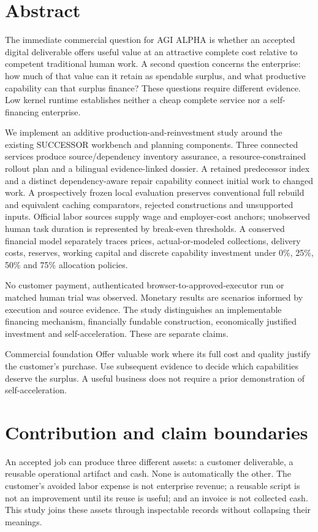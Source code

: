 \documentclass[11pt,a4paper]{article}
\begin{document}
\section*{Abstract}
The immediate commercial question for AGI ALPHA is whether an accepted digital deliverable offers useful value at an attractive complete cost relative to competent traditional human work. A second question concerns the enterprise: how much of that value can it retain as spendable surplus, and what productive capability can that surplus finance? These questions require different evidence. Low kernel runtime establishes neither a cheap complete service nor a self-financing enterprise.

We implement an additive production-and-reinvestment study around the existing SUCCESSOR workbench and planning components. Three connected services produce source/dependency inventory assurance, a resource-constrained rollout plan and a bilingual evidence-linked dossier. A retained predecessor index and a distinct dependency-aware repair capability connect initial work to changed work. A prospectively frozen local evaluation preserves conventional full rebuild and equivalent caching comparators, rejected constructions and unsupported inputs. Official labor sources supply wage and employer-cost anchors; unobserved human task duration is represented by break-even thresholds. A conserved financial model separately traces prices, actual-or-modeled collections, delivery costs, reserves, working capital and discrete capability investment under 0\%, 25\%, 50\% and 75\% allocation policies.



No customer payment, authenticated browser-to-approved-executor run or matched human trial was observed. Monetary results are scenarios informed by execution and source evidence. The study distinguishes an implementable financing mechanism, financially fundable construction, economically justified investment and self-acceleration. These are separate claims.

\begin{finding}{Commercial foundation}
Offer valuable work where its full cost and quality justify the customer's purchase. Use subsequent evidence to decide which capabilities deserve the surplus. A useful business does not require a prior demonstration of self-acceleration.
\end{finding}

\section{Contribution and claim boundaries}
\label{sec:contribution}
An accepted job can produce three different assets: a customer deliverable, a reusable operational artifact and cash. None is automatically the other. The customer's avoided labor expense is not enterprise revenue; a reusable script is not an improvement until its reuse is useful; and an invoice is not collected cash. This study joins these assets through inspectable records without collapsing their meanings.
\end{document}
